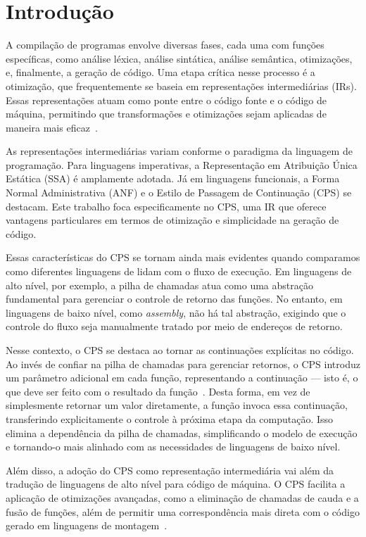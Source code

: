 \chapter{Introdução}\label{sec:introducao}

A compilação de programas envolve diversas fases, cada uma com funções específicas, como análise léxica, análise sintática, análise semântica, otimizações, e, finalmente, a geração de código.
Uma etapa crítica nesse processo é a otimização, que frequentemente se baseia em representações intermediárias (IRs).
Essas representações atuam como ponte entre o código fonte e o código de máquina, permitindo que transformações e otimizações sejam aplicadas de maneira mais eficaz~\cite{plotkin1975call}.

As representações intermediárias variam conforme o paradigma da linguagem de programação.
Para linguagens imperativas, a Representação em Atribuição Única Estática (SSA) é amplamente adotada.
Já em linguagens funcionais, a Forma Normal Administrativa (ANF) e o Estilo de Passagem de Continuação (CPS) se destacam.
Este trabalho foca especificamente no CPS, uma IR que oferece vantagens particulares em termos de otimização e simplicidade na geração de código.

Essas características do CPS se tornam ainda mais evidentes quando comparamos como diferentes linguagens de lidam com o fluxo de execução. Em linguagens de alto nível, por exemplo, a pilha de chamadas atua como uma abstração fundamental para gerenciar o controle de retorno das funções. No entanto, em linguagens de baixo nível, como \textit{assembly}, não há tal abstração, exigindo que o controle do fluxo seja manualmente tratado por meio de endereços de retorno.

Nesse contexto, o CPS se destaca ao tornar as continuações explícitas no código.
Ao invés de confiar na pilha de chamadas para gerenciar retornos, o CPS introduz um parâmetro adicional em cada função, representando a continuação — isto é, o que deve ser feito com o resultado da função~\cite{kennedy2007continuations}.
Desta forma, em vez de simplesmente retornar um valor diretamente, a função invoca essa continuação, transferindo explicitamente o controle à próxima etapa da computação.
Isso elimina a dependência da pilha de chamadas, simplificando o modelo de execução e tornando-o mais alinhado com as necessidades de linguagens de baixo nível.

Além disso, a adoção do CPS como representação intermediária vai além da tradução de linguagens de alto nível para código de máquina.
O CPS facilita a aplicação de otimizações avançadas, como a eliminação de chamadas de cauda e a fusão de funções, além de permitir uma correspondência mais direta com o código gerado em linguagens de montagem~\cite{flanagan1993essence}.

